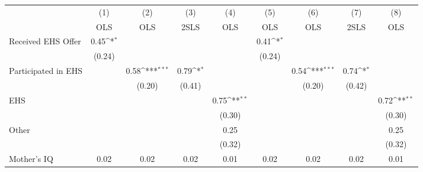 {
\def\sym#1{\ifmmode^{#1}\else\(^{#1}\)\fi}
\begin{tabular}{l*{8}{c}}
\hline\hline
                    &\multicolumn{1}{c}{(1)}&\multicolumn{1}{c}{(2)}&\multicolumn{1}{c}{(3)}&\multicolumn{1}{c}{(4)}&\multicolumn{1}{c}{(5)}&\multicolumn{1}{c}{(6)}&\multicolumn{1}{c}{(7)}&\multicolumn{1}{c}{(8)}\\
                    &\multicolumn{1}{c}{OLS}&\multicolumn{1}{c}{OLS}&\multicolumn{1}{c}{2SLS}&\multicolumn{1}{c}{OLS}&\multicolumn{1}{c}{OLS}&\multicolumn{1}{c}{OLS}&\multicolumn{1}{c}{2SLS}&\multicolumn{1}{c}{OLS}\\
\hline
Received EHS Offer  &        0.45\sym{*}  &                     &                     &                     &        0.41\sym{*}  &                     &                     &                     \\
                    &      (0.24)         &                     &                     &                     &      (0.24)         &                     &                     &                     \\
[1em]
Participated in EHS &                     &        0.58\sym{***}&        0.79\sym{*}  &                     &                     &        0.54\sym{***}&        0.74\sym{*}  &                     \\
                    &                     &      (0.20)         &      (0.41)         &                     &                     &      (0.20)         &      (0.42)         &                     \\
[1em]
EHS                 &                     &                     &                     &        0.75\sym{**} &                     &                     &                     &        0.72\sym{**} \\
                    &                     &                     &                     &      (0.30)         &                     &                     &                     &      (0.30)         \\
[1em]
Other               &                     &                     &                     &        0.25         &                     &                     &                     &        0.25         \\
                    &                     &                     &                     &      (0.32)         &                     &                     &                     &      (0.32)         \\
[1em]
Mother's IQ         &        0.02         &        0.02         &        0.02         &        0.01         &        0.02         &        0.02         &        0.02         &        0.01         \\

\end{tabular}}
